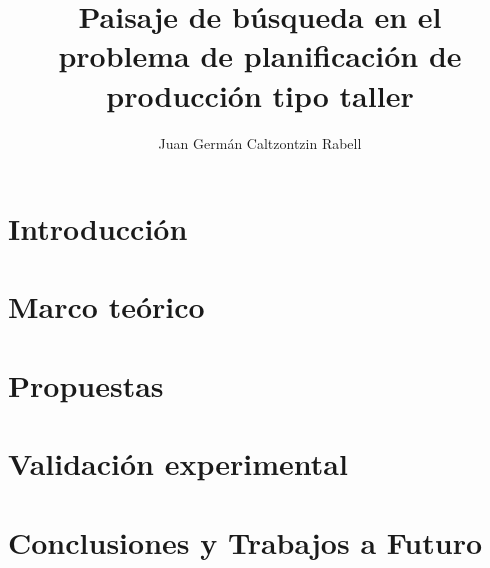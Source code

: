 \documentclass[12pt,letterpaper]{book}
\author{Juan Germán Caltzontzin Rabell}
\title{Paisaje de búsqueda en el problema de planificación de producción tipo taller}
\begin{document}

\pagebreak \frontmatter
 \newpage

\dominitoc \tableofcontents \let\cleardoublepage\clearpage

\mainmatter

\chapter{Introducción}\label{cap:introduccion}  \minitoc








%
\newpage

\chapter{Marco teórico}\label{cap:marcot} \minitoc



\newpage

\chapter{Propuestas}\label{cap:prop}





\chapter{Validación experimental}






\newpage
\chapter{Conclusiones y Trabajos a Futuro}\label{cap:ct} \minitoc


\appendix
 \newpage



\end{document}
